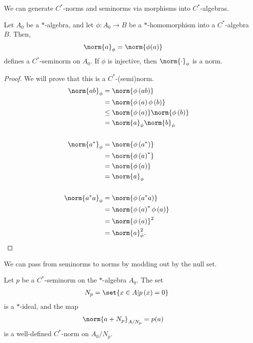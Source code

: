 \documentclass[10pt]{mypackage}
\begin{document}
We can generate $C^{\ast}$-norms and seminorms via morphisms into $C^{\ast}$-algebras.
\begin{lemma}
  Let $A_0$ be a $\ast$-algebra, and let $\phi\colon A_0\rightarrow B$ be a $\ast$-homomorphism into a $C^{\ast}$-algebra $B$. Then,
  \begin{align*}
    \norm{a}_{\phi} &= \norm{\phi(a)}
  \end{align*}
  defines a $C^{\ast}$-seminorm on $A_0$. If $\phi$ is injective, then $\norm{\cdot}_{\phi}$ is a norm.
\end{lemma}
\begin{proof}
  We will prove that this is a $C^{\ast}$-(semi)norm.
  \begin{align*}
    \norm{ab}_{\phi} &= \norm{\phi\left(ab\right)}\\
                     &= \norm{\phi\left(a\right)\phi\left(b\right)}\\
                     &\leq \norm{\phi\left(a\right)}\norm{\phi\left(b\right)}\\
                     &= \norm{a}_{\phi}\norm{b}_{\phi}\\
                     \\
    \norm{a^{\ast}}_{\phi} &= \norm{\phi\left(a^{\ast}\right)}\\
                           &= \norm{\phi\left(a\right)^{\ast}}\\
                           &= \norm{\phi\left(a\right)}\\
                           &= \norm{a}_{\phi}\\
                           \\
    \norm{a^{\ast}a}_{\phi} &= \norm{\phi\left(a^{\ast}a\right)}\\
                            &= \norm{\phi\left(a\right)^{\ast}\phi\left(a\right)}\\
                            &= \norm{\phi\left(a\right)}^2\\
                            &= \norm{a}_{\phi}^2.
  \end{align*}
\end{proof}
We can pass from seminorms to norms by modding out by the null set.
\begin{lemma}
  Let $p$ be a $C^{\ast}$-seminorm on the $\ast$-algebra $A_0$. The set
  \begin{align*}
    N_p = \set{x\in A | p\left(x\right) = 0}
  \end{align*}
  is a $\ast$-ideal, and the map
  \begin{align*}
    \norm{a + N_p}_{A/N_p} &= p(a)
  \end{align*}
  is a well-defined $C^{\ast}$-norm on $A_0/N_p$.
\end{lemma}
\end{document}
